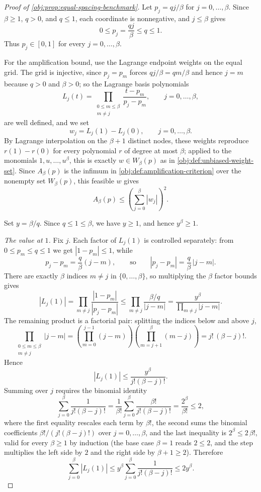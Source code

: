 \documentclass[11pt]{article}
\begin{document}
\begin{proof}[Proof of \cref{obj:prop:equal-spacing-benchmark}]
Let \(p_j=qj/\beta\) for \(j=0,\ldots,\beta\). Since \(\beta\ge1\), \(q>0\), and \(q\le1\), each coordinate is nonnegative, and \(j\le\beta\) gives
\[
0\le p_j=\frac{qj}{\beta}\le q\le1.
\]
Thus \(p_j\in[0,1]\) for every \(j=0,\ldots,\beta\). %

For the amplification bound, use the Lagrange endpoint weights on the equal grid. The grid is injective, since \(p_j=p_m\) forces \(qj/\beta=qm/\beta\) and hence \(j=m\) because \(q>0\) and \(\beta>0\); %
so the Lagrange basis polynomials
\[
L_j(t)=\prod_{\substack{0\le m\le\beta\\ m\ne j}}\frac{t-p_m}{p_j-p_m},
\qquad j=0,\ldots,\beta,
\]
are well defined, and we set
\[
w_j=L_j(1)-L_j(0),
\qquad j=0,\ldots,\beta .
\]
By Lagrange interpolation on the \(\beta+1\) distinct nodes, these weights reproduce \(r(1)-r(0)\) for every polynomial \(r\) of degree at most \(\beta\); applied to the monomials \(1,u,\ldots,u^\beta\), this is exactly \(w\in W_\beta(p)\) as in \cref{obj:def:unbiased-weight-set}. %
Since \(A_\beta(p)\) is the infimum in \cref{obj:def:amplification-criterion} over the nonempty set \(W_\beta(p)\), this feasible \(w\) gives
\[
A_\beta(p)\le \left(\sum_{j=0}^{\beta}|w_j|\right)^2.
\] %

Set \(y=\beta/q\). Since \(q\le1\le\beta\), we have \(y\ge1\), and hence \(y^\beta\ge1\). %

\emph{The value at \(1\).}
Fix \(j\). Each factor of \(L_j(1)\) is controlled separately: from \(0\le p_m\le q\le 1\) we get \(|1-p_m|\le1\), while
\[
p_j-p_m=\frac{q}{\beta}(j-m),
\qquad\text{so}\qquad
|p_j-p_m|=\frac{q}{\beta}\,|j-m| .
\]
There are exactly \(\beta\) indices \(m\ne j\) in \(\{0,\ldots,\beta\}\), so multiplying the \(\beta\) factor bounds gives
\[
|L_j(1)|
=
\prod_{m\ne j}\frac{|1-p_m|}{|p_j-p_m|}
\le
\prod_{m\ne j}\frac{\beta/q}{|j-m|}
=
\frac{y^\beta}{\prod_{m\ne j}|j-m|}.
\]
The remaining product is a factorial pair: splitting the indices below and above \(j\),
\[
\prod_{\substack{0\le m\le\beta\\ m\ne j}}|j-m|
=
\left(\prod_{m=0}^{j-1}(j-m)\right)\left(\prod_{m=j+1}^{\beta}(m-j)\right)
=
j!\,(\beta-j)! .
\]
Hence
\[
|L_j(1)|
\le
\frac{y^\beta}{j!(\beta-j)!}.
\] %
Summing over \(j\) requires the binomial identity
\[
\sum_{j=0}^{\beta}\frac{1}{j!(\beta-j)!}
=
\frac{1}{\beta!}\sum_{j=0}^{\beta}\frac{\beta!}{j!(\beta-j)!}
=
\frac{2^\beta}{\beta!}
\le
2,
\]
where the first equality rescales each term by \(\beta!\), the second sums the binomial coefficients \(\beta!/(j!(\beta-j)!)\) over \(j=0,\ldots,\beta\), and the last inequality is \(2^\beta\le2\,\beta!\), valid for every \(\beta\ge1\) by induction (the base case \(\beta=1\) reads \(2\le2\), and the step multiplies the left side by \(2\) and the right side by \(\beta+1\ge2\)). %
Therefore
\[
\sum_{j=0}^{\beta}|L_j(1)|
\le
y^\beta\sum_{j=0}^{\beta}\frac{1}{j!(\beta-j)!}
\le
2y^\beta .
\]


\end{proof}
\end{document}
